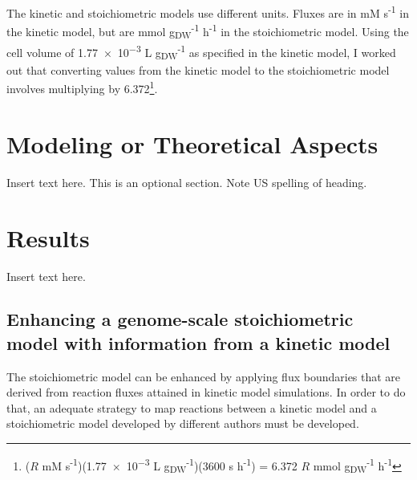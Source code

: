 \documentclass[a4paper, 12pt]{scrartcl}
\begin{document}
{%
The kinetic and stoichiometric models use different units. Fluxes are in mM s\textsuperscript{-1} in the kinetic model, but are mmol g\textsubscript{DW}\textsuperscript{-1} h\textsuperscript{-1} in the stoichiometric model. Using the cell volume of \num{1.77e-3} L g\textsubscript{DW}\textsuperscript{-1} as specified in the kinetic model, I worked out that converting values from the kinetic model to the stoichiometric model involves multiplying by 6.372\footnote{
($R$ mM s\textsuperscript{-1})(\num{1.77e-3} L g\textsubscript{DW}\textsuperscript{-1})(3600 s h\textsuperscript{-1}) = 6.372 $R$ mmol g\textsubscript{DW}\textsuperscript{-1} h\textsuperscript{-1}
}.

\section*{Modeling or Theoretical Aspects}
\label{sec:theory}

Insert text here.  This is an optional section.  Note US spelling of heading.

\section*{Results}
\label{sec:results}

Insert text here.

\subsection*{Enhancing a genome-scale stoichiometric model with information from a kinetic model}
\label{ssec:results-enhance}

The stoichiometric model can be enhanced by applying flux boundaries that are derived from reaction fluxes attained in kinetic model simulations.  In order to do that, an adequate strategy to map reactions between a kinetic model and a stoichiometric model developed by different authors must be developed.

}
\end{document}
